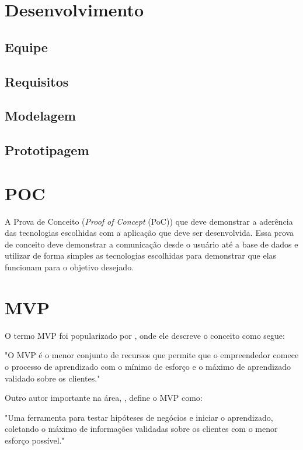 \documentclass[
	article,			%
	12pt,				%
	oneside,			%
	a4paper,			%
    BIBLATEX,           %
	english,			%
	brazil,				%
	sumario=tradicional
	]{abntex2}
\begin{document}
\section{Desenvolvimento}

\subsection{Equipe}
\lipsum[1]

\subsection{Requisitos}
\lipsum[1]

\subsection{Modelagem}
\lipsum[1]

\subsection{Prototipagem}
\lipsum[1]

\section{POC}

A Prova de Conceito (\textit{Proof of Concept} (PoC)) que deve demonstrar a aderência das tecnologias escolhidas com a aplicação que deve ser desenvolvida. Essa prova de conceito deve demonstrar a comunicação desde o usuário até a base de dados e utilizar de forma simples as tecnologias escolhidas para demonstrar que
elas funcionam para o objetivo desejado.

\section{MVP}

O termo MVP foi popularizado por  , onde ele descreve o conceito como segue:

"O MVP é o menor conjunto de recursos que permite que o empreendedor comece o processo de aprendizado com o mínimo de esforço e o máximo de aprendizado validado sobre os clientes."

Outro autor importante na área, , define o MVP como:

"Uma ferramenta para testar hipóteses de negócios e iniciar o aprendizado, coletando o máximo de informações validadas sobre os clientes com o menor esforço possível."
\end{document}
